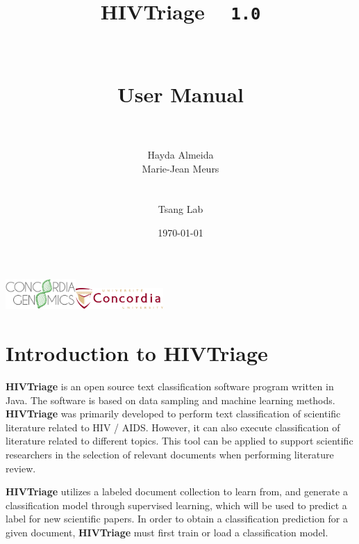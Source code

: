 \documentclass[11pt]{article}
\newcommand{\system}{{\bf{HIVTriage}}}
\def\version{{\tt 1.0}}
\begin{document}
\title{\system{} ~ \version \\~\\~\\User Manual\\~\\}

\author{Hayda Almeida\\Marie-Jean Meurs\\~\\~\\Tsang Lab}

\date{\mydate\today}

\maketitle

\begin{center}
	\includegraphics[width=0.2\textwidth]{genomicslogogreen}\hspace{5cm}\includegraphics[width=0.25\textwidth]{concordialogo}\\
\end{center}

\pagestyle{empty}

\pagebreak
\tableofcontents

\pagebreak

\section{Introduction to \system{}}

\system{} is an open source text classification software program written in Java.
The software is based on data sampling and machine learning methods.
\system{} was primarily developed to perform text classification of scientific literature related to HIV / AIDS.
However, it can also execute classification of literature related to different topics. 
This tool can be applied to support scientific researchers in the selection of relevant documents when performing literature review.

\system{} utilizes a labeled document collection to learn from, 
and generate a classification model through supervised learning, 
which will be used to predict a label for new scientific papers.
In order to obtain a classification prediction for a given document, 
\system{} must first train or load a classification model.
\end{document}
